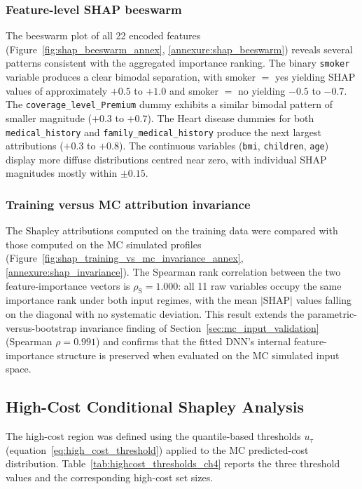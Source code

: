\subsubsection{Feature-level SHAP beeswarm}

The beeswarm plot of all 22 encoded features
(Figure~\ref{fig:shap_beeswarm_annex},
\ref{annexure:shap_beeswarm}) reveals several patterns
consistent with the aggregated importance ranking.  The binary
\texttt{smoker} variable produces a clear bimodal separation, with
smoker $=$ yes yielding SHAP values of approximately $+0.5$ to $+1.0$
and smoker $=$ no yielding $-0.5$ to $-0.7$.  The
\texttt{coverage\_level\_\allowbreak{}Premium} dummy exhibits a similar bimodal
pattern of smaller magnitude ($+0.3$ to $+0.7$).  The Heart disease
dummies for both \texttt{medical\_\allowbreak{}history} and
\texttt{family\_medical\_\allowbreak{}history} produce the next largest attributions
($+0.3$ to $+0.8$).  The continuous variables (\texttt{bmi},
\texttt{children}, \texttt{age}) display more diffuse distributions
centred near zero, with individual SHAP magnitudes mostly within
$\pm 0.15$.

\subsubsection{Training versus MC attribution invariance}

The Shapley attributions computed on the training data were compared with
those computed on the MC simulated profiles
(Figure~\ref{fig:shap_training_vs_mc_invariance_annex},
\ref{annexure:shap_invariance}).  The Spearman rank correlation
between the two feature-importance vectors is $\rho_{\mathrm{S}} =
1.000$: all 11 raw variables occupy the same importance rank under both
input regimes, with the mean $|\text{SHAP}|$ values falling on the
diagonal with no systematic deviation.  This result extends the
parametric-versus-bootstrap invariance finding of
Section~\ref{sec:mc_input_validation} (Spearman $\rho = 0.991$) and
confirms that the fitted DNN's internal feature-importance
structure is preserved when evaluated on the MC simulated input
space.


\subsection{High-Cost Conditional Shapley Analysis}
\label{sec:highcost_conditional_results}

The high-cost region was defined using the quantile-based thresholds
$u_{\tau}$ (equation~\eqref{eq:high_cost_threshold}) applied to the
MC predicted-cost distribution.
Table~\ref{tab:highcost_thresholds_ch4} reports the three threshold
values and the corresponding high-cost set sizes.

